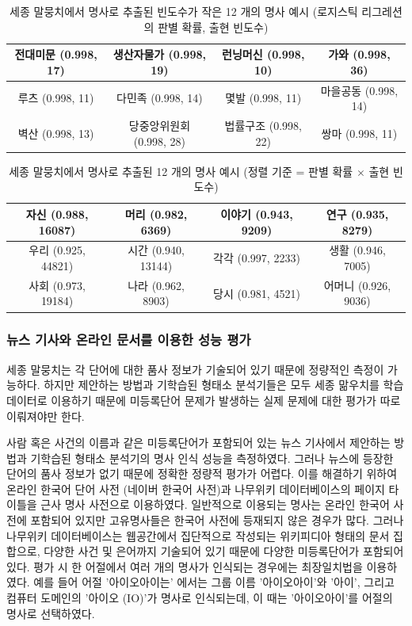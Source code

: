 \documentclass[11pt]{article}
\begin{document}
\begin{table}[ht]
\small
\centering
\caption{세종 말뭉치에서 명사로 추출된 빈도수가 작은 12 개의 명사 예시 (로지스틱 리그레션의 판별 확률, 출현 빈도수)}
\label{tab:sejong_infrequent}
\begin{tabular}{|c|c|c|c|}
\hline
전대미문 (0.998, 17) & 생산자물가 (0.998, 19) & 런닝머신 (0.998, 10) & 가와 (0.998, 36) \\ \hline
루츠 (0.998, 11) & 다민족 (0.998, 14) & 몇발 (0.998, 11) & 마을공동 (0.998, 14) \\ \hline
벽산 (0.998, 13) & 당중앙위원회 (0.998, 28) & 법률구조 (0.998, 22) & 쌍마 (0.998, 11) \\ \hline
\end{tabular}%
\end{table}

\begin{table}[ht]
\small
\centering
\caption{세종 말뭉치에서 명사로 추출된 12 개의 명사 예시 (정렬 기준 = 판별 확률 $\times$ 출현 빈도수)}
\label{tab:sejong_frequent}
\begin{tabular}{|c|c|c|c|}
\hline
자신 (0.988, 16087) & 머리 (0.982, 6369) & 이야기 (0.943, 9209) & 연구 (0.935, 8279) \\ \hline
우리 (0.925, 44821) & 시간 (0.940, 13144) & 각각 (0.997, 2233) & 생활 (0.946, 7005) \\ \hline
사회 (0.973, 19184) & 나라 (0.962, 8903) & 당시 (0.981, 4521) & 어머니 (0.926, 9036) \\ \hline
\end{tabular}%
\end{table}


\subsubsection{뉴스 기사와 온라인 문서를 이용한 성능 평가}

세종 말뭉치는 각 단어에 대한 품사 정보가 기술되어 있기 때문에 정량적인 측정이 가능하다.
하지만 제안하는 방법과 기학습된 형태소 분석기들은 모두 세종 맒우치를 학습 데이터로 이용하기 때문에 미등록단어 문제가 발생하는 실제 문제에 대한 평가가 따로 이뤄져야만 한다.

사람 혹은 사건의 이름과 같은 미등록단어가 포함되어 있는 뉴스 기사에서 제안하는 방법과 기학습된 형태소 분석기의 명사 인식 성능을 측정하였다.
그러나 뉴스에 등장한 단어의 품사 정보가 없기 때문에 정확한 정량적 평가가 어렵다.
이를 해결하기 위하여 온라인 한국어 단어 사전 (네이버 한국어 사전)과 나무위키 데이터베이스의 페이지 타이틀을 근사 명사 사전으로 이용하였다.
일반적으로 이용되는 명사는 온라인 한국어 사전에 포함되어 있지만 고유명사들은 한국어 사전에 등재되지 않은 경우가 많다.
그러나 나무위키 데이터베이스는 웹공간에서 집단적으로 작성되는 위키피디아 형태의 문서 집합으로, 다양한 사건 및 은어까지 기술되어 있기 때문에 다양한 미등록단어가 포함되어 있다.
평가 시 한 어절에서 여러 개의 명사가 인식되는 경우에는 최장일치법을 이용하였다.
예를 들어 어절 '아이오아이는' 에서는 그룹 이름 '아이오아이'와 '아이', 그리고 컴퓨터 도메인의 '아이오 (IO)'가 명사로 인식되는데, 이 때는 '아이오아이'를 어절의 명사로 선택하였다.
\end{document}
